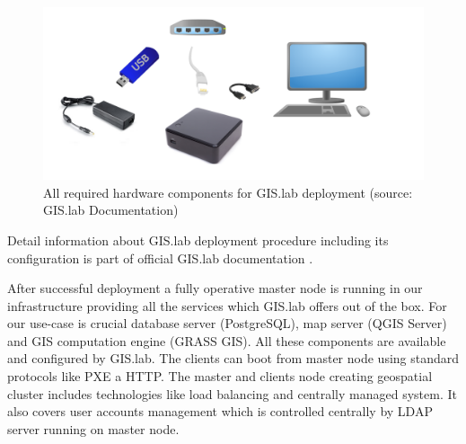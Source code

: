 \documentclass{isprs}
\begin{document}
\begin{figure}[ht!]
\begin{center}
  \includegraphics[width=1.0\columnwidth]{figures/installation-unit.png}
  \caption{All required hardware components for GIS.lab deployment
    (source: GIS.lab Documentation)}
\label{fig:gislab_infrastructure}
\end{center}
\end{figure}

Detail information about GIS.lab deployment procedure including its
configuration is part of official GIS.lab documentation
\cite{gislab-docs}.

After successful deployment a fully operative master node is running
in our infrastructure providing all the services which GIS.lab offers
out of the box. For our use-case is crucial database server
(PostgreSQL), map server (QGIS Server) and GIS computation engine
(GRASS GIS). All these components are available and configured by
GIS.lab. The clients can boot from master node using standard
protocols like PXE a HTTP. The master and clients node creating
geospatial cluster includes technologies like load balancing and
centrally managed system. It also covers user accounts management
which is controlled centrally by LDAP server running on master node.
\end{document}
